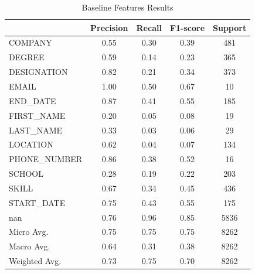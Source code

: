 \documentclass[a4paper, conference]{ieeeconf}
\begin{document}
  \begin{table}[ht!]
    \centering
    \begin{tabular}{|l|c|c|c|c|}
         \hline
             & Precision & Recall & F1-score & Support \\
         \hline
     COMPANY & 0.55 & 0.30 & 0.39 &  481 \\
      DEGREE & 0.59 & 0.14 & 0.23 &  365 \\
 DESIGNATION & 0.82 & 0.21 & 0.34 &  373 \\
       EMAIL & 1.00 & 0.50 & 0.67 &   10 \\
    END\_DATE & 0.87 & 0.41 & 0.55 &  185 \\
  FIRST\_NAME & 0.20 & 0.05 & 0.08 &   19 \\
   LAST\_NAME & 0.33 & 0.03 & 0.06 &   29 \\
    LOCATION & 0.62 & 0.04 & 0.07 &  134 \\
PHONE\_NUMBER & 0.86 & 0.38 & 0.52 &   16 \\
      SCHOOL & 0.28 & 0.19 & 0.22 &  203 \\
       SKILL & 0.67 & 0.34 & 0.45 &  436 \\
  START\_DATE & 0.75 & 0.43 & 0.55 &  175 \\
         nan & 0.76 & 0.96 & 0.85 & 5836 \\
         \hline

   Micro Avg. & 0.75 & 0.75 & 0.75 & 8262 \\
   Macro Avg. & 0.64 & 0.31 & 0.38 & 8262 \\
Weighted Avg. & 0.73 & 0.75 & 0.70 & 8262 \\
         \hline
    \end{tabular}
    \caption{Baseline Features Results}
    \label{table:4}
  \end{table}
\end{document}
